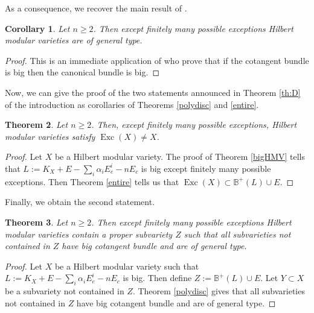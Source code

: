 \documentclass[JEP,XML,SOM,Unicode]{cedram}
\theoremstyle{plain}
\newtheorem{theorem}{Theorem}[section]
\newtheorem{corollary}[theorem]{Corollary}
\theoremstyle{definition}
\numberwithin{equation}{theorem}
\DeclareMathOperator{\Exc}{Exc}
\newcommand\BB{\mathbb B}
\begin{document}
As a consequence, we recover the main result of \cite{Tsu85}.

\begin{corollary}
Let $n \geq 2$. Then except finitely many possible exceptions Hilbert modular varieties are of general type.
\end{corollary}
\begin{proof}
This is an immediate application of \cite{CP15} who prove that if the cotangent bundle is big then the canonical bundle is big.
\end{proof}

Now, we can give the proof of the two statements announced in Theorem \ref{th:D} of the introduction as corollaries of Theorems \ref{polydisc} and \ref{entire}.

\begin{theorem}
Let $n \geq 2$. Then, except finitely many possible exceptions, Hilbert modular varieties satisfy $\Exc(X) \neq X$.
\end{theorem}
\begin{proof}
Let $X$ be a Hilbert modular variety. The proof of Theorem \ref{bigHMV} tells that $L:=K_X+E-\sum_i \alpha_i E_e^i - nE_c$ is big except finitely many possible exceptions. Then Theorem \ref{entire} tells us that $\Exc(X) \subset \BB^{+}(L)\cup E$.
\end{proof}

Finally, we obtain the second statement.

\begin{theorem}
Let $n \geq 2$. Then except finitely many possible exceptions Hilbert modular varieties contain a proper subvariety $Z$ such that all subvarieties not contained in $Z$ have big cotangent bundle and are of general type.
\end{theorem}

\begin{proof}
Let $X$ be a Hilbert modular variety such that $L:=K_X+E-\sum_i \alpha_i E_e^i - nE_c$ is big. Then define $Z:=\BB^{+}(L)\cup E$. Let $Y \subset X$ be a subvariety not contained in $Z$. Theorem \ref{polydisc} gives that all subvarieties not contained in $Z$ have big cotangent bundle and are of general type.
\end{proof}
\egroup

\backmatter


\end{document}
